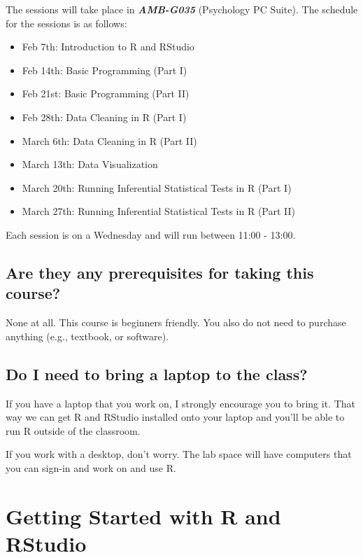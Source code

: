 \documentclass[
]{book}
\providecommand{\tightlist}{%
  \setlength{\itemsep}{0pt}\setlength{\parskip}{0pt}}
\begin{document}
The sessions will take place in \textbf{\emph{AMB-G035}} (Psychology PC Suite). The schedule for the sessions is as follows:

\begin{itemize}
\tightlist
\item
  Feb 7th: Introduction to R and RStudio
\item
  Feb 14th: Basic Programming (Part I)
\item
  Feb 21st: Basic Programming (Part II)
\item
  Feb 28th: Data Cleaning in R (Part I)
\item
  March 6th: Data Cleaning in R (Part II)
\item
  March 13th: Data Visualization
\item
  March 20th: Running Inferential Statistical Tests in R (Part I)
\item
  March 27th: Running Inferential Statistical Tests in R (Part II)
\end{itemize}

Each session is on a Wednesday and will run between 11:00 - 13:00.

\hypertarget{are-they-any-prerequisites-for-taking-this-course}{%
\section{Are they any prerequisites for taking this course?}\label{are-they-any-prerequisites-for-taking-this-course}}

None at all. This course is beginners friendly. You also do not need to purchase anything (e.g., textbook, or software).

\hypertarget{do-i-need-to-bring-a-laptop-to-the-class}{%
\section{Do I need to bring a laptop to the class?}\label{do-i-need-to-bring-a-laptop-to-the-class}}

If you have a laptop that you work on, I strongly encourage you to bring it. That way we can get R and RStudio installed onto your laptop and you'll be able to run R outside of the classroom.

If you work with a desktop, don't worry. The lab space will have computers that you can sign-in and work on and use R.

\hypertarget{rstudio}{%
\chapter{Getting Started with R and RStudio}\label{rstudio}}
\end{document}
